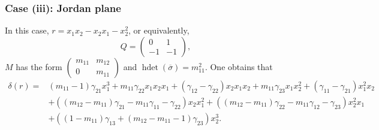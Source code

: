 \documentclass[a4paper,10pt]{amsart}
\theoremstyle{definition}
\numberwithin{equation}{section}
\DeclareMathOperator{\hdet}{hdet}
\begin{document}
\subsubsection{Case (iii): Jordan plane}In this case, $r=x_1x_2-x_2x_1-x_2^2$, or equivalently,
$$Q=\left(
\begin{array}{cc}
0 & 1\\
-1  &  -1
\end{array}
\right),$$
$M$ has the form $
\left(
\begin{array}{cc}
m_{11}  & m_{12}\\
0   &m_{11}
\end{array}
\right)
$ and $\hdet(\overline{\sigma})=m_{11}^2$. One obtains that
\begin{align*}
\delta(r)=&(m_{11}-1)\gamma_{21}x_1^3+m_{11}\gamma_{22}x_1x_2x_1+(\gamma_{12}-\gamma_{22})x_2x_1x_2+m_{11}\gamma_{23}x_1x_2^2+(\gamma_{11}-\gamma_{21})x_1^2x_2\\
&+((m_{12}-m_{11})\gamma_{21}-m_{11}\gamma_{11}-\gamma_{22})x_2x_1^2+((m_{12}-m_{11})\gamma_{22}-m_{11}\gamma_{12}-\gamma_{23})x_2^2x_1\\
&+((1-m_{11})\gamma_{13}+(m_{12}-m_{11}-1)\gamma_{23})x _2^3.
\end{align*}
\end{document}
